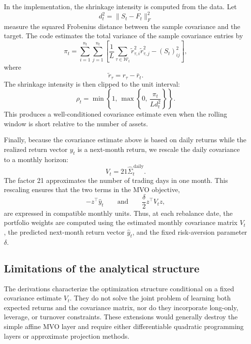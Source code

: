 \documentclass{article}
\begin{document}
In the implementation, the shrinkage intensity is computed from the data. Let
\[
d_t^2 = \|S_t - F_t\|_F^2
\]
measure the squared Frobenius distance between the sample covariance and the
target. The code estimates the total variance of the sample covariance entries
by
\[
\pi_t
=
\sum_{i=1}^{n_t}\sum_{j=1}^{n_t}
\left[
\frac{1}{L}\sum_{\tau\in\mathcal W_t}
\tilde r_{\tau,i}^2 \tilde r_{\tau,j}^2
-
(S_t)_{ij}^2
\right],
\]
where
\[
\tilde r_{\tau} = r_{\tau}-\bar r_t.
\]
The shrinkage intensity is then clipped to the unit interval:
\[
\rho_t
=
\min\left\{
1,\,
\max\left\{
0,\,
\frac{\pi_t}{L d_t^2}
\right\}
\right\}.
\]
This produces a well-conditioned covariance estimate even when the rolling
window is short relative to the number of assets.

Finally, because the covariance estimate above is based on daily returns while
the realized return vector \(y_t\) is a next-month return, we rescale the daily
covariance to a monthly horizon:
\[
V_t
=
21\widehat{\Sigma}^{\,\mathrm{daily}}_t.
\]
The factor 21 approximates the number of trading days in one month. This
rescaling ensures that the two terms in the MVO objective,
\[
-z^\top \hat y_t
\qquad\text{and}\qquad
\frac{\delta}{2}z^\top V_t z,
\]
are expressed in compatible monthly units. Thus, at each rebalance date, the
portfolio weights are computed using the estimated monthly covariance matrix
\(V_t\), the predicted next-month return vector \(\hat y_t\), and the fixed
risk-aversion parameter \(\delta\).

\subsection{Limitations of the analytical structure}

The derivations characterize the optimization structure conditional on a fixed
covariance estimate \(V_t\). They do not solve the joint problem of learning
both expected returns and the covariance matrix, nor do they incorporate
long-only, leverage, or turnover constraints. These extensions would generally
destroy the simple affine MVO layer and require either differentiable quadratic
programming layers or approximate projection methods.
\end{document}

